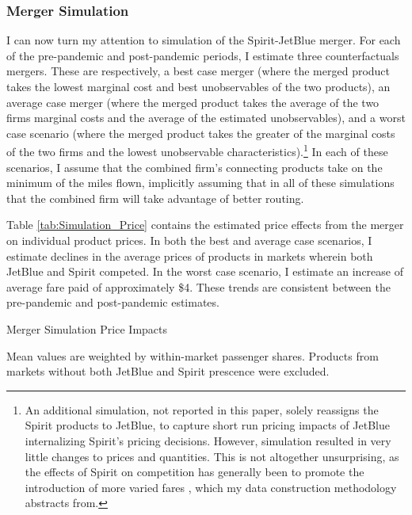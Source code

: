 \documentclass{article}
\begin{document}
	\subsubsection{Merger Simulation}
	\label{sec:Analysis_Merger}
	I can now turn my attention to simulation of the Spirit-JetBlue merger. For each of the pre-pandemic and post-pandemic periods, I estimate three counterfactuals mergers. These are respectively, a best case merger (where the merged product takes the lowest marginal cost and best unobservables of the two products), an average case merger (where the merged product takes the average of the two firms marginal costs and the average of the estimated unobservables), and a worst case scenario (where the merged product takes the greater of the marginal costs of the two firms and the lowest unobservable characteristics).\footnote{An additional simulation, not reported in this paper, solely reassigns the Spirit products to JetBlue, to capture short run pricing impacts of JetBlue internalizing Spirit's pricing decisions. However, simulation resulted in very little changes to prices and quantities. This is not altogether unsurprising, as the effects of Spirit on competition has generally been to promote the introduction of more varied fares \citep{shrago_spirit_2024}, which my data construction methodology abstracts from.} In each of these scenarios, I assume that the combined firm's connecting products take on the minimum of the miles flown, implicitly assuming that in all of these simulations that the combined firm will take advantage of better routing. %

     
	 Table \ref{tab:Simulation_Price} contains the estimated price effects from the merger on individual product prices. In both the best and average case scenarios, I estimate declines in the average prices of products in markets wherein both JetBlue and Spirit competed. In the worst case scenario, I estimate an increase of average fare paid of approximately \$4. These trends are consistent between the pre-pandemic and post-pandemic estimates.  
     
    \begin{table}
        \caption{Merger Simulation Price Impacts}
        \label{tab:Simulation_Price}
                \vspace{-15mm}
        \begin{center}
         
         \footnotesize{Mean values are weighted by within-market passenger shares. Products from markets without both JetBlue and Spirit prescence were excluded. }
        \end{center}
     \end{table}
\end{document}
